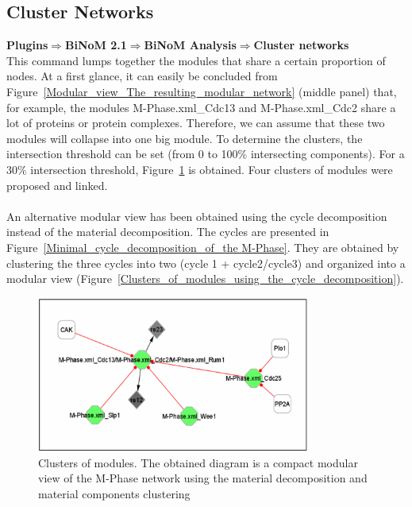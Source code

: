 \subsection{Cluster Networks}
\textbf{Plugins$\Rightarrow$BiNoM 2.1$\Rightarrow$BiNoM Analysis$\Rightarrow$Cluster networks}\\
This command lumps together the modules that share a certain proportion of nodes. At a first glance, it can easily be concluded from Figure~\ref{Modular_view_The_resulting_modular_network} (middle panel) that, for example, the modules M-Phase.xml\_Cdc13 and M-Phase.xml\_Cdc2 share a lot of proteins or protein complexes. Therefore, we can assume that these two modules will collapse into one big module. To determine the clusters, the intersection threshold can be set (from 0 to 100\% intersecting components). For a 30\% intersection threshold, Figure~\ref{Clusters_of_modules_using_the_material_decomposition} is obtained. Four clusters of modules were proposed and linked.\\\\
An alternative modular view has been obtained using the cycle decomposition instead of the material decomposition. The cycles are presented in Figure~\ref{Minimal_cycle_decomposition_of_the M-Phase}. They are obtained by clustering the three cycles into two (cycle 1 + cycle2/cycle3) and organized into a modular view (Figure~\ref{Clusters_of_modules_using_the_cycle_decomposition}).\\
\begin{figure}
\centering
\includegraphics[width=0.8\textwidth]{graphics/Clusters_of_modules_using_the_material_decomposition}
\caption{Clusters of modules. The obtained diagram is a compact modular view of the M-Phase network using the material decomposition and material components clustering}
\label{Clusters_of_modules_using_the_material_decomposition}
\end{figure}
